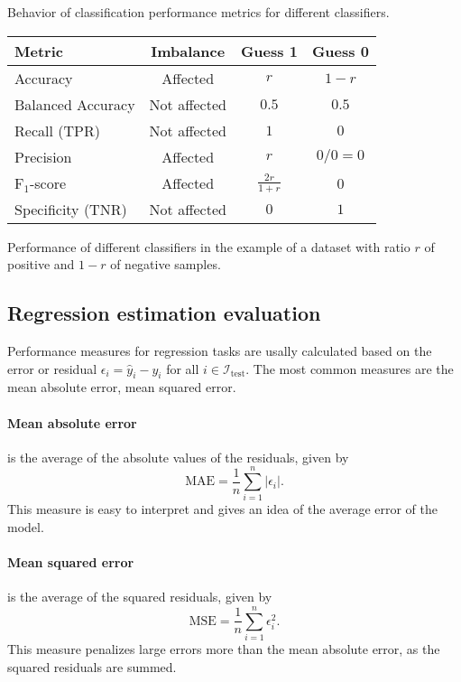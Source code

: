 \begin{tablebox}[label=tab:classification-metrics-ex]{Behavior of classification
  performance metrics for different classifiers.}
  \centering
  \begin{tabular}{l c c c}
    \toprule
    \textbf{Metric} & \textbf{Imbalance} & \textbf{Guess 1} & \textbf{Guess 0} \\
    \midrule
    Accuracy & Affected & $r$ & $1 - r$ \\
    Balanced Accuracy & Not affected & $0.5$ & $0.5$ \\
    Recall (TPR) & Not affected & $1$ & $0$ \\
    Precision & Affected & $r$ & $0/0 = 0$ \\
    F$_1$-score & Affected & $\frac{2r}{1 + r}$ & 0 \\
    Specificity (TNR) & Not affected & $0$ & $1$ \\
    \bottomrule
  \end{tabular}
  \tcblower
  Performance of different classifiers in the example of a dataset with ratio $r$ of
  positive and $1-r$ of negative samples.
\end{tablebox}


\subsection{Regression estimation evaluation}

Performance measures for regression tasks are usally calculated based on the error or residual
$\epsilon_i = \hat{y}_i - y_i$ for all $i \in \mathcal{I}_\text{test}$.  The most common measures
are the mean absolute error, mean squared error.

\paragraph{Mean absolute error} is the average of the absolute values of the residuals,
given by
\begin{equation*}
  \text{MAE} = \frac{1}{n} \sum_{i=1}^n | \epsilon_i |\text{.}
\end{equation*}
This measure is easy to interpret and gives an idea of the average error of the model.

\paragraph{Mean squared error} is the average of the squared residuals, given by
\begin{equation*}
  \text{MSE} = \frac{1}{n} \sum_{i=1}^n \epsilon_i^2\text{.}
\end{equation*}
This measure penalizes large errors more than the mean absolute error, as the squared
residuals are summed.

